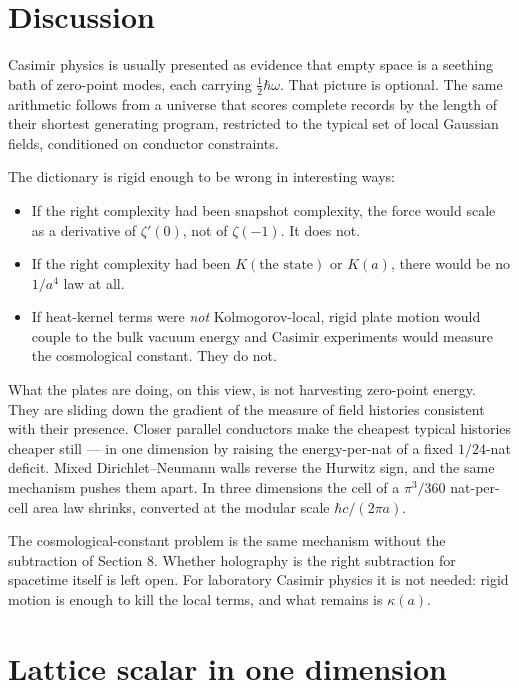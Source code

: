 \documentclass[11pt,letterpaper]{article}
\begin{document}
\section{Discussion}


Casimir physics is usually presented as evidence that empty space is a seething bath of zero-point modes, each carrying \(\tfrac12\hbar\omega\). That picture is optional. The same arithmetic follows from a universe that scores complete records by the length of their shortest generating program, restricted to the typical set of local Gaussian fields, conditioned on conductor constraints.


The dictionary is rigid enough to be wrong in interesting ways:


\begin{itemize}
\item If the right complexity had been snapshot complexity, the force would scale as a derivative of \(\zeta'(0)\), not of \(\zeta(-1)\). It does not.
\item If the right complexity had been \(K(\text{the state})\) or \(K(a)\), there would be no \(1/a^{4}\) law at all.
\item If heat-kernel terms were \emph{not} Kolmogorov-local, rigid plate motion would couple to the bulk vacuum energy and Casimir experiments would measure the cosmological constant. They do not.
\end{itemize}


What the plates are doing, on this view, is not harvesting zero-point energy. They are sliding down the gradient of the measure of field histories consistent with their presence. Closer parallel conductors make the cheapest typical histories cheaper still — in one dimension by raising the energy-per-nat of a fixed \(1/24\)-nat deficit. Mixed Dirichlet–Neumann walls reverse the Hurwitz sign, and the same mechanism pushes them apart. In three dimensions the cell of a \(\pi^{3}/360\) nat-per-cell area law shrinks, converted at the modular scale \(\hbar c/(2\pi a)\).


The cosmological-constant problem is the same mechanism without the subtraction of Section 8. Whether holography is the right subtraction for spacetime itself is left open. For laboratory Casimir physics it is not needed: rigid motion is enough to kill the local terms, and what remains is \(\kappa(a)\).



\appendix

\section{Lattice scalar in one dimension}
\end{document}
